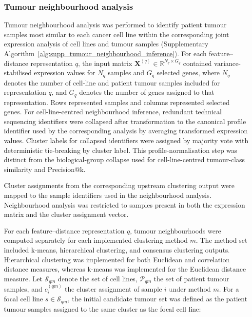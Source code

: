 \subsubsection{Tumour neighbourhood analysis}

Tumour neighbourhood analysis was performed to identify patient tumour
samples most similar to each cancer cell line within the corresponding
joint expression analysis of cell lines and tumour samples (Supplementary
Algorithm~\ref{alg:supp_tumour_neighbourhood_inference}). For each
feature--distance representation \(q\), the input matrix
\(\mathbf{X}^{(q)} \in \mathbb{R}^{N_q \times G_q}\) contained
variance-stabilised expression values for \(N_q\) samples and
\(G_q\) selected genes, where \(N_q\) denotes the number of cell-line and
patient tumour samples included for representation \(q\), and \(G_q\) denotes
the number of genes assigned to that representation. Rows represented samples and
columns represented selected genes. For cell-line-centred neighbourhood
inference, redundant technical sequencing identifiers were collapsed after
transformation to the canonical profile identifier used by the corresponding
analysis by averaging transformed expression values. Cluster labels for
collapsed identifiers were assigned by majority vote with deterministic
tie-breaking by cluster label. This profile-normalisation step was distinct
from the biological-group collapse used for cell-line-centred tumour-class
similarity and Precision@k.

Cluster assignments from the corresponding upstream clustering output were
mapped to the sample identifiers used in the neighbourhood analysis.
Neighbourhood analysis was restricted to samples present in both the expression
matrix and the cluster assignment vector.

For each feature--distance representation \(q\), tumour neighbourhoods were computed
separately for each implemented clustering method \(m\). The method set
included k-means, hierarchical clustering, and consensus clustering outputs.
Hierarchical clustering was implemented for both Euclidean and correlation
distance measures, whereas k-means was implemented for the Euclidean distance
measure. Let
\(\mathcal{S}_{qm}\) denote the set of cell lines,
\(\mathcal{P}_{qm}\) the set of patient tumour samples, and
\(c_i^{(qm)}\) the cluster assignment of sample \(i\) under method
\(m\). For a focal cell line \(s \in \mathcal{S}_{qm}\), the initial
candidate tumour set was defined as the patient tumour samples
assigned to the same cluster as the focal cell line:


